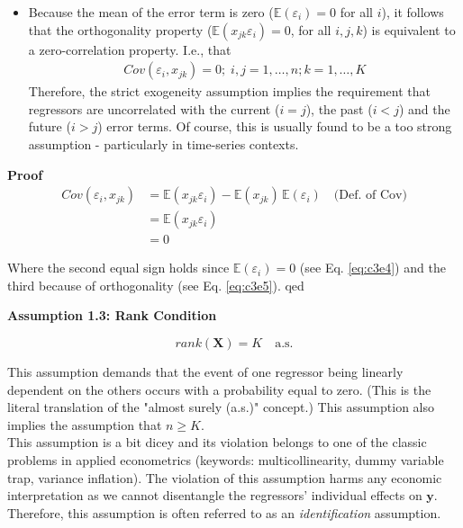 \documentclass[
]{book}
\providecommand{\tightlist}{%
  \setlength{\itemsep}{0pt}\setlength{\parskip}{0pt}}
\begin{document}
\hfill\break

\begin{itemize}
\tightlist
\item
  Because the mean of the error term is zero (\(\mathbb{E}(\varepsilon_i)=0\) for all
  \(i\)), it follows that the orthogonality property
  (\(\mathbb{E}(x_{jk}\varepsilon_i)=0\), for all \(i,j,k\)) is equivalent to a
  zero-correlation property. I.e., that
  \begin{align}
    Cov(\varepsilon_i,x_{jk}) = 0;\; i,j=1,\dots,n; k=1,\dots,K
     \label{eq:c3e6}
  \end{align}
  Therefore, the strict exogeneity assumption implies the requirement
  that regressors are uncorrelated with the current (\(i=j\)), the past
  (\(i<j\)) and the future (\(i>j\)) error terms. Of course, this is
  usually found to be a too strong assumption - particularly in
  time-series contexts.
\end{itemize}

\textbf{Proof}
\begin{align*}
      Cov(\varepsilon_i,x_{jk}) &= \mathbb{E}(x_{jk}\varepsilon_i)-\mathbb{E}(x_{jk})\,\mathbb{E}(\varepsilon_i)\quad{\text{(Def.~of Cov)}}\\
       &= \mathbb{E}(x_{jk}\varepsilon_i)\\
       &= 0
\end{align*}

Where the second equal sign holds since \(\mathbb{E}(\varepsilon_i)=0\) (see Eq. \eqref{eq:c3e4}) and the third because of orthogonality (see Eq. \eqref{eq:c3e5}).
qed

\hfill\break

\textbf{Assumption 1.3: Rank Condition}

\[rank(\mathbf{X})=K\quad\text{a.s.}\]

This assumption demands that the event of one regressor being linearly
dependent on the others occurs with a probability equal to zero. (This
is the literal translation of the "almost surely (a.s.)" concept.)
This assumption also implies the assumption that \(n\geq K\).\\
This assumption is a bit dicey and its violation belongs to one of the
classic problems in applied econometrics (keywords: multicollinearity,
dummy variable trap, variance inflation). The violation of this
assumption harms any economic interpretation as we cannot disentangle
the regressors' individual effects on \(\mathbf{y}\). Therefore, this
assumption is often referred to as an \emph{identification} assumption.\\
\end{document}
